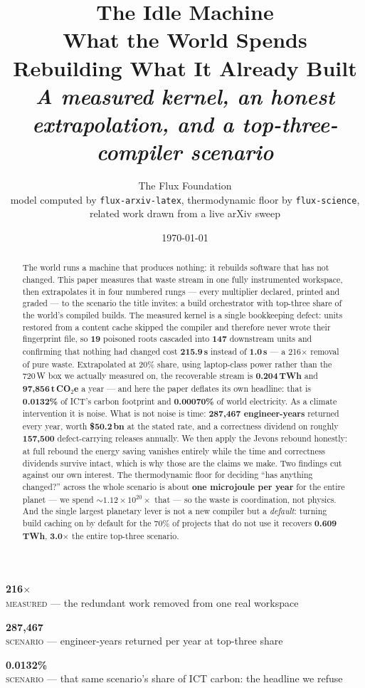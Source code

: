 \documentclass[11pt,a4paper]{article}
\title{\textbf{The Idle Machine}\\[6pt]\large What the World Spends Rebuilding What It Already Built\\[4pt]\normalsize\itshape A measured kernel, an honest extrapolation, and a top-three-compiler scenario}
\author{The Flux Foundation\\\small model computed by \texttt{flux-arxiv-latex}, thermodynamic floor by \texttt{flux-science},\\\small related work drawn from a live arXiv sweep}
\date{\today}
\newcommand{\measured}[1]{\textcolor{sigilcyan}{\textbf{#1}}}
\newcommand{\derivedv}[1]{\textcolor{sigilviolet}{\textbf{#1}}}
\newcommand{\scen}[1]{\textcolor{sigilamber}{\textbf{#1}}}
\newcommand{\kpi}[3]{\begin{minipage}[t]{0.31\textwidth}\begin{tcolorbox}[colback=panelbg,colframe=slate,boxrule=0.5pt,arc=2pt,halign=center]{\large\bfseries\textcolor{#1}{#2}}\\[2pt]{\scriptsize #3}\end{tcolorbox}\end{minipage}}
\begin{document}
\maketitle
\vspace{-12pt}\noindent
\kpi{sigilcyan}{216$\times$}{\textsc{measured} --- the redundant work removed from one real workspace}\hfill
\kpi{sigilamber}{287{,}467}{\textsc{scenario} --- engineer-years returned per year at top-three share}\hfill
\kpi{sigilred}{0.0132\%}{\textsc{scenario} --- that same scenario's share of ICT carbon: the headline we refuse}

\vspace{6pt}

\begin{abstract}\noindent
The world runs a machine that produces nothing: it rebuilds software that has not changed. This paper measures that waste stream in one fully instrumented workspace, then extrapolates it in four numbered rungs --- every multiplier declared, printed and graded --- to the scenario the title invites: a build orchestrator with top-three share of the world's compiled builds. The measured kernel is a single bookkeeping defect: units restored from a content cache skipped the compiler and therefore never wrote their fingerprint file, so \measured{19} poisoned roots cascaded into \measured{147} downstream units and confirming that nothing had changed cost \measured{215.9\,s} instead of \measured{1.0\,s} --- a 216$\times$ removal of pure waste. Extrapolated at 20\% share, using laptop-class power rather than the 720\,W box we actually measured on, the recoverable stream is \scen{0.204\,TWh} and \scen{97{,}856\,t\,CO$_2$e} a year --- and here the paper deflates its own headline: that is \scen{0.0132\%} of ICT's carbon footprint and \scen{0.00070\%} of world electricity. As a climate intervention it is noise. What is not noise is time: \scen{287{,}467 engineer-years} returned every year, worth \scen{\$50.2\,bn} at the stated rate, and a correctness dividend on roughly \scen{157{,}500} defect-carrying releases annually. We then apply the Jevons rebound honestly: at full rebound the energy saving vanishes entirely while the time and correctness dividends survive intact, which is why those are the claims we make. Two findings cut against our own interest. The thermodynamic floor for deciding ``has anything changed?'' across the whole scenario is about \derivedv{one microjoule per year} for the entire planet --- we spend $\sim1.12\times10^{20}\times$ that --- so the waste is coordination, not physics. And the single largest planetary lever is not a new compiler but a \emph{default}: turning build caching on by default for the 70\% of projects that do not use it recovers \scen{0.609\,TWh}, \scen{3.0$\times$} the entire top-three scenario.
\end{abstract}
\end{document}
